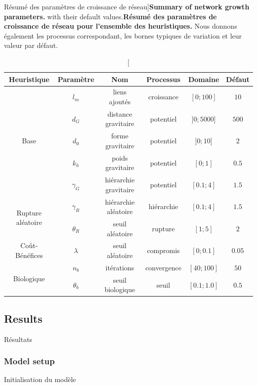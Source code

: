 \begin{table}
\caption[Summary of network growth parameters][Résumé des paramètres de croissance de réseau]{\textbf{Summary of network growth parameters.} with their default values.\label{tab:networkgrowth:parameters}}{\textbf{Résumé des paramètres de croissance de réseau pour l'ensemble des heuristiques.} Nous donnons également les processus correspondant, les bornes typiques de variation et leur valeur par défaut.\label{tab:networkgrowth:parameters}}
\begin{tabular}{|c|c|c|c|c|c|}
  \hline
Heuristique & Paramètre & Nom & Processus & Domaine & Défaut\\
  \hline
\multirow{5}{*}{Base}& $l_m$ & liens ajoutés & croissance & $[0;100]$ & $10$ \\\cline{2-6}
 & $d_G$ & distance gravitaire & potentiel & $]0;5000]$ & $500$ \\\cline{2-6}
 & $d_0$ & forme gravitaire & potentiel & $]0;10]$ & $2$ \\\cline{2-6}
 & $k_h$ & poids gravitaire & potentiel & $[0;1]$ & $0.5$ \\\cline{2-6}
 & $\gamma_G$ & hiérarchie gravitaire & potentiel & $[0.1;4]$ & $1.5$ \\\hline
\multirow{2}{*}{Rupture aléatoire}& $\gamma_R$ & hiérarchie aléatoire & hiérarchie & $[0.1;4]$ & $1.5$ \\\cline{2-6}
& $\theta_R$ & seuil aléatoire & rupture & $[1;5]$ & $2$ \\\hline
Coût-Bénéfices& $\lambda$ & seuil aléatoire & compromis & $[0;0.1]$ & $0.05$ \\\hline
\multirow{2}{*}{Biologique}& $n_b$ & itérations & convergence & $[40;100]$ & $50$ \\\cline{2-6}
& $\theta_b$ & seuil biologique & seuil & $[0.1;1.0]$ & $0.5$ \\\hline
\end{tabular}
\end{table}






\subsection{Results}{Résultats}


\subsubsection{Model setup}{Initialisation du modèle}

